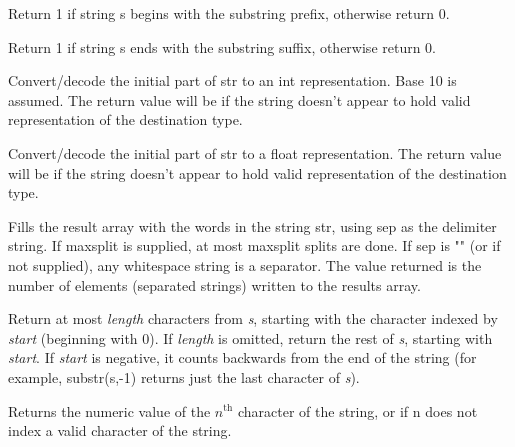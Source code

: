 \documentclass[11pt,letterpaper]{book}
\begin{document}
Return 1 if string {\cf s} begins with the substring {\cf prefix},
otherwise return 0.
\apiend

Return 1 if string {\cf s} ends with the substring {\cf suffix},
otherwise return 0.
\apiend

Convert/decode the initial part of {\cf str} to an {\cf int} 
representation.  Base 10 is assumed.
The return value will be {} if the string doesn't appear to hold
valid representation of the destination type.
\apiend

Convert/decode the initial part of {\cf str} to a {\cf float} representation.
The return value will be {} if the string doesn't appear to hold
valid representation of the destination type.
\apiend


Fills the {\cf result} array with the words in the string {\cf str},
using {\cf sep} as the delimiter string.  If {\cf maxsplit} is supplied,
at most {\cf maxsplit} splits are done.  If {\cf sep} is {\cf ""} (or if
not supplied), any whitespace string is a separator.  The value returned
is the number of elements (separated strings) written to the {\cf results}
array.
\apiend

Return at most \emph{length} characters from \emph{s}, starting with the
character indexed by \emph{start} (beginning with 0).  If \emph{length}
is omitted, return the rest of \emph{s}, starting with \emph{start}.  If
\emph{start} is negative, it counts backwards from the end of the string
(for example, {\cf substr(s,-1)} returns just the last character of
\emph{s}).
\apiend

Returns the numeric value of the $n^{\mathrm{th}}$ character of the string,
or {} if {\cf n} does not index a valid character of the string.
\apiend
\end{document}
